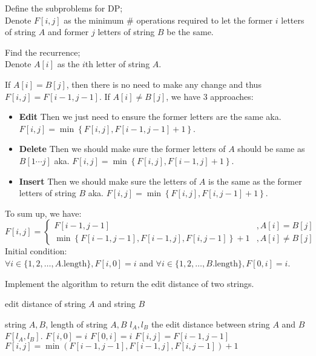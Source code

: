 \documentclass[a4paper,11pt]{article}
\begin{document}
\begin{qparts}
\item Define the subproblems for DP;\\
Denote $F[i,j]$ as the minimum \# operations required to let the former $i$ letters of string $A$ and former $j$ letters of string $B$ be the same.

\item Find the recurrence;\\
Denote $A[i]$ as the $i$th letter of string $A$.

If $A[i]=B[j]$, then there is no need to make any change and thus $F[i,j]=F[i-1,j-1]$.
If $A[i]\neq B[j]$, we have 3 approaches:
\begin{itemize}
    
    \item \textbf{Edit} Then we just need to ensure the former letters are the same aka. $F[i,j]=\min \left\{ F[i,j],F[i-1,j-1]+1 \right\} $.
    \item \textbf{Delete} Then we should make sure the former letters of $A$ should be same as $B[1\cdots j]$ aka. $F[i,j]=\min \left\{ F[i,j],F[i-1,j]+1 \right\} $.
    \item \textbf{Insert} Then we should make sure the letters of $A$ is the same as the former letters of string $B$ aka. $F[i,j]=\min \left\{ F[i,j],F[i,j-1]+1 \right\} $.
\end{itemize}
To sum up, we have:
$$
F[i,j]=
\begin{cases}
    F[i-1,j-1]&,A[i]=B[j]\\
    \min \left\{ F[i-1,j-1],F[i-1,j],F[i,j-1] \right\}+1&,A[i]\neq B[j] 
\end{cases}
$$
Initial condition: \\
$\forall i \in \{ 1,2, \ldots ,A.\text{length}\},F[i,0]=i$ and $\forall i \in \{ 1,2, \ldots ,B.\text{length} \},F[0,i]=i$.

\item Implement the algorithm to return the edit distance of two strings.
\begin{algorithm}
    \caption{edit distance of string $A$ and string $B$}
    \begin{algorithmic}
        \Require string $A,B$, length of string $A,B$ $l_{A},l_{B}$
        \Ensure the edit distance between string $A$ and $B$ $F[l_{A},l_{B}]$.
        \State $F[i,0]=i$
        \EndFor
        \State $F[0,i]=i$
        \EndFor
        \State $F[i,j]=F[i-1,j-1]$
        \Else
        \State $F[i,j]=\min \left( F[i-1,j-1],F[i-1,j],F[i,j-1] \right) +1$
        \EndIf
        \EndFor
        \EndFor
    \end{algorithmic}
\end{algorithm}

\end{qparts}
\end{document}
